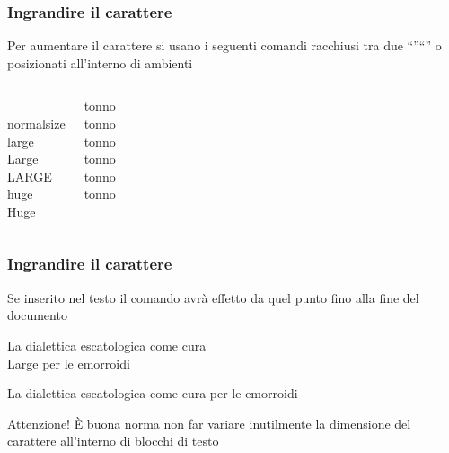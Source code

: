 \documentclass[svgnames,%
	ucs,%
	pdftex]{guitbeamer}
\begin{document}
\begin{frame}
  \frametitle{Ingrandire il carattere}
	Per aumentare il carattere si usano i seguenti comandi racchiusi tra due ``\LCmd[]{\{}''\;``\LCmd[]{\}}'' o posizionati all'interno di ambienti
	\begin{columns}
		\begin{LaTeXcode}
			\\normalsize \vspace{-.2ex}\n
			\\large \vspace{1ex}\n
			\\Large \vspace{1.8ex}\n
			\\LARGE \vspace{2.4ex}\n
			\\huge \vspace{3.4ex}\n
			\\Huge 
		\end{LaTeXcode}
	  \column[t]{.3\textwidth}
		\begin{LaTeXoutput}[]
			tonno\\
			\large tonno \\
			\Large tonno\\
			\LARGE tonno\\
			\huge tonno\\
			\Huge tonno
		\end{LaTeXoutput}
	\end{columns}
\end{frame}
\begin{frame}
  \frametitle{Ingrandire il carattere}
	Se inserito nel testo il comando avr\`a effetto da quel punto fino alla fine del documento 
	\begin{LaTeXcode}
		La dialettica escatologica come cura \alert{\\Large} per le
		emorroidi
	\end{LaTeXcode}
	\begin{LaTeXoutput}
		La dialettica escatologica come cura \Large per le emorroidi
	\end{LaTeXoutput}
	\begin{block}{Attenzione!}
		\`E buona norma non far variare inutilmente la dimensione del carattere all'interno di blocchi di testo
	\end{block}
\end{frame}
\end{document}

